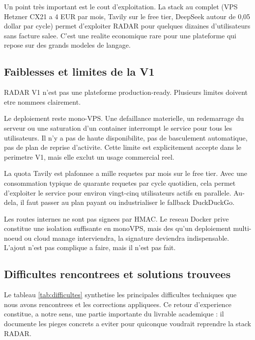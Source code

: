 \documentclass[12pt,a4paper,openany]{report}
\begin{document}
Un point très important est le cout d'exploitation. La stack au complet (VPS Hetzner CX21 a 4 EUR par mois, Tavily sur le free tier, DeepSeek autour de 0{,}05 dollar par cycle) permet d'exploiter RADAR pour quelques dizaines d'utilisateurs sans facture salee. C'est une realite economique rare pour une plateforme qui repose sur des grands modeles de langage.

\subsection{Faiblesses et limites de la V1}
\label{sec:faiblesses}

RADAR V1 n'est pas une plateforme production-ready. Plusieurs limites doivent etre nommees clairement.

Le deploiement reste mono-VPS. Une defaillance materielle, un redemarrage du serveur ou une saturation d'un container interrompt le service pour tous les utilisateurs. Il n'y a pas de haute disponibilite, pas de basculement automatique, pas de plan de reprise d'activite. Cette limite est explicitement accepte dans le perimetre V1, mais elle exclut un usage commercial reel.

La quota Tavily est plafonnee a mille requetes par mois sur le free tier. Avec une consommation typique de quarante requetes par cycle quotidien, cela permet d'exploiter le service pour environ vingt-cinq utilisateurs actifs en parallele. Au-dela, il faut passer au plan payant ou industrialiser le fallback DuckDuckGo.

Les routes internes ne sont pas signees par HMAC. Le reseau Docker prive constitue une isolation suffisante en monoVPS, mais des qu'un deploiement multi-noeud ou cloud manage interviendra, la signature deviendra indispensable. L'ajout n'est pas complique a faire, mais il n'est pas fait.




\subsection{Difficultes rencontrees et solutions trouvees}
\label{sec:difficultes}

Le tableau \ref{tab:difficultes} synthetise les principales difficultes techniques que nous avons rencontrees et les corrections appliquees. Ce retour d'experience constitue, a notre sens, une partie importante du livrable academique : il documente les pieges concrets a eviter pour quiconque voudrait reprendre la stack RADAR.
\end{document}
